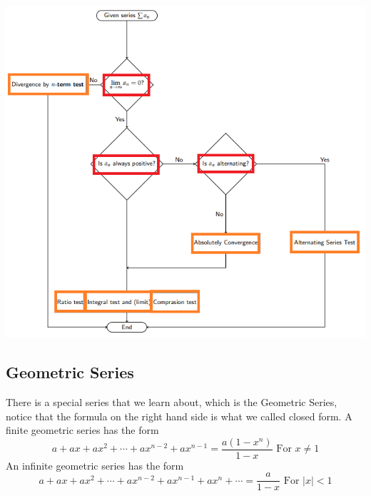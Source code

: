 \documentclass[12pt]{article}
\theoremstyle{definition}
\theoremstyle{definition}
\theoremstyle{remark}
\theoremstyle{definition}
\theoremstyle{definition}
\theoremstyle{definition}
\begin{document}
\includegraphics[width=1\textwidth]{program.png}


\subsection{Geometric Series}
There is a special series that we learn about, which is the Geometric Series, notice that the formula on the right hand side is what we called closed form. 
A finite geometric series has the form
\[a + ax + ax^2 + \cdots + ax^{n−2} + ax^{n−1}=\frac{a(1-x^n)}{1-x}\text{ For } x \neq 1\]
An infinite geometric series has the form
\[a + ax + ax^2 + \cdots + ax^{n−2} + ax^{n−1}+ax^n +\cdots=\frac{a}{1-x}\text{ For } |x| < 1\]
\end{document}
